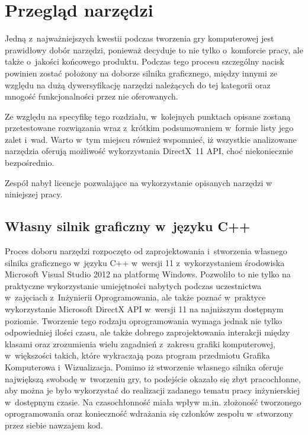
\chapter{Przegląd narzędzi}
Jedną z~najważniejszych kwestii podczas tworzenia gry komputerowej jest prawidłowy dobór narzędzi, ponieważ decyduje to nie tylko o~komforcie pracy, ale także o~jakości końcowego produktu. Podczas tego procesu szczególny nacisk powinien zostać położony na doborze silnika graficznego, między innymi ze względu na dużą dywersyfikację narzędzi należących do tej kategorii oraz mnogość funkcjonalności przez nie oferowanych.

Ze względu na specyfikę tego rozdziału, w~kolejnych punktach opisane zostaną przetestowane rozwiązania wraz z~krótkim podsumowaniem w~formie listy jego zalet i~wad. Warto w~tym miejscu również wspomnieć, iż wszystkie analizowane narzędzia oferują możliwość wykorzystania DirectX~11 API, choć niekoniecznie bezpośrednio.

Zespół nabył licencje pozwalające na wykorzystanie opisanych narzędzi w niniejszej pracy.

\section{Własny silnik graficzny w~języku C++}
Proces doboru narzędzi rozpoczęto od zaprojektowania i~stworzenia własnego silnika graficznego w~języku C++ w~wersji 11 z~wykorzystaniem środowiska Microsoft Visual Studio 2012 na platformę Windows. Pozwoliło to nie tylko na praktyczne wykorzystanie umiejętności nabytych podczas uczestnictwa w~zajęciach z~Inżynierii Oprogramowania, ale także poznać w~praktyce wykorzystanie Microsoft DirectX API w~wersji 11 na najniższym dostępnym poziomie. Tworzenie tego rodzaju oprogramowania wymaga jednak nie tylko odpowiedniej ilości czasu, ale także dobrego zaprojektowania interakcji między klasami oraz zrozumienia wielu zagadnień z~zakresu grafiki komputerowej, w~większości takich, które wykraczają poza program przedmiotu Grafika Komputerowa i~Wizualizacja.
Pomimo iż stworzenie własnego silnika oferuje największą swobodę w~tworzeniu gry, to podejście okazało się zbyt pracochłonne, aby można je było wykorzystać do realizacji zadanego tematu pracy inżynierskiej w~dostępnym czasie. Na czasochłonność miała wpływ m.in. złożoność tworzonego oprogramowania oraz konieczność wdrażania się członków zespołu w~stworzony przez siebie nawzajem kod.\\

